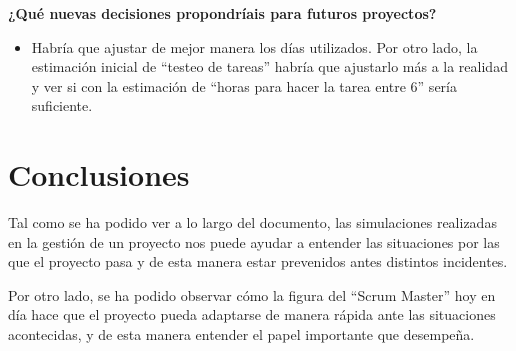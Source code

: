 \documentclass{\ClassPath/viu-tfm-template}
\begin{document}
\textbf{¿Qué nuevas decisiones propondríais para futuros proyectos?}
\vspace{-12pt}
\begin{itemize}
    \item Habría que ajustar de mejor manera los días utilizados. Por otro lado, la estimación inicial de “testeo de tareas” habría que ajustarlo más a la realidad y ver si con la estimación de “horas para hacer la tarea entre 6” sería suficiente.
\end{itemize}



\chapter{Conclusiones}

Tal como se ha podido ver a lo largo del documento, las simulaciones realizadas en la gestión de un proyecto nos puede ayudar a entender las situaciones por las que el proyecto pasa y de esta manera estar prevenidos antes distintos incidentes.

Por otro lado, se ha podido observar cómo la figura del “Scrum Master” hoy en día hace que el proyecto pueda adaptarse de manera rápida ante las situaciones acontecidas, y de esta manera entender el papel importante que desempeña.
\end{document}
